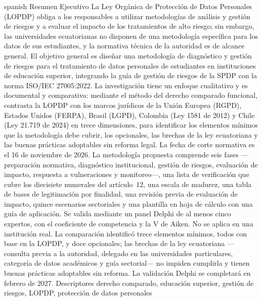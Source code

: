 \clearpage\UTIResumenPagina
  {spanish}
  {Resumen Ejecutivo}
  {La Ley Orgánica de Protección de Datos Personales (LOPDP) obliga a los responsables a utilizar metodologías de análisis y gestión de riesgos y a evaluar el impacto de los tratamientos de alto riesgo; sin embargo, las universidades ecuatorianas no disponen de una metodología específica para los datos de sus estudiantes, y la normativa técnica de la autoridad es de alcance general. El objetivo general es diseñar una metodología de diagnóstico y gestión de riesgos para el tratamiento de datos personales de estudiantes en instituciones de educación superior, integrando la guía de gestión de riesgos de la SPDP con la norma ISO/IEC 27005:2022. La investigación tiene un enfoque cualitativo y es documental y comparativa: mediante el método del derecho comparado funcional, contrasta la LOPDP con los marcos jurídicos de la Unión Europea (RGPD), Estados Unidos (FERPA), Brasil (LGPD), Colombia (Ley 1581 de 2012) y Chile (Ley 21.719 de 2024) en trece dimensiones, para identificar los elementos mínimos que la metodología debe cubrir, los opcionales, las brechas de la ley ecuatoriana y las buenas prácticas adoptables sin reforma legal. La fecha de corte normativa es el 16 de noviembre de 2026. La metodología propuesta comprende seis fases ---preparación normativa, diagnóstico institucional, gestión de riesgos, evaluación de impacto, respuesta a vulneraciones y monitoreo---, una lista de verificación que cubre los diecisiete numerales del artículo~12, una escala de madurez, una tabla de bases de legitimación por finalidad, una revisión previa de evaluación de impacto, quince escenarios sectoriales y una plantilla en hoja de cálculo con una guía de aplicación. Se valida mediante un panel Delphi de al menos cinco expertos, con el coeficiente de competencia y la V de Aiken. No se aplica en una institución real. La comparación identificó trece elementos mínimos, todos con base en la LOPDP, y doce opcionales; las brechas de la ley ecuatoriana ---consulta previa a la autoridad, delegado en las universidades particulares, categoría de datos académicos y guía sectorial--- no impiden cumplirla y tienen buenas prácticas adoptables sin reforma. La validación Delphi se completará en febrero de 2027.}
  {Descriptores}
  {derecho comparado, educación superior, gestión de riesgos, LOPDP, protección de datos personales}
